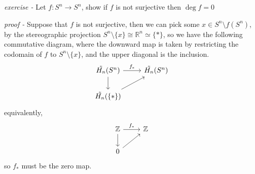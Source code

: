 \documentclass[11pt]{article}
\theoremstyle{definition}
\newcommand{\set}[1]{\{#1\}}
\begin{document}


    \emph{exercise - }\label{HEx11} Let \(f: S^n \to S^n\), show if \(f\) is not surjective then \(\deg f = 0\)

    \emph{proof - } Suppose that \(f\) is not surjective, then we can pick some \(x \in S^n \setminus f(S^n)\), by the stereographic projection \(S^n \setminus \set{x} \cong \mathbb{R}^n \simeq \set{*}\), so we have the following commutative diagram, where the downward map is taken by restricting the codomain of \(f\) to \(S^n \setminus \set{x}\), and the upper diagonal is the inclusion.
    \begin{equation*}
        \begin{tikzcd}
            \tilde{H_n}(S^n) \arrow[r,"{f_*}"] \arrow[d] &\tilde{H_n}(S^n) \\
            \tilde{H_n}(\set{*}) \arrow[ur]
        \end{tikzcd}
    \end{equation*}
    equivalently,
    \begin{equation*}
        \begin{tikzcd}
            \mathbb{Z} \arrow[r,"{f_*}"] \arrow[d] &\mathbb{Z} \\
            0 \arrow[ur]
        \end{tikzcd}
    \end{equation*}
    so \(f_*\) must be the zero map.

\end{document}
